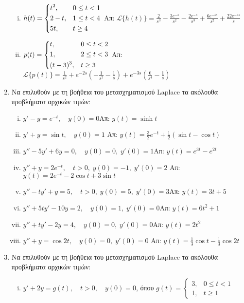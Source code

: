 \begin{enumerate}
\begin{enumerate}[i)]
      \item $h(t)=
        \begin{dcases} 
          t^{2}, & 0\leq t<1 \\ 2-t, & 1\leq t < 4 \\ 5t, & t\geq 4
        \end{dcases}$ 
        \hfill Απ: $\mathcal{L}\{h(t)\}=\frac{2}{s^{3}}-\frac{3e^{-s}}{s^{2}}-
        \frac{2e^{-s}}{s^{3}}+\frac{6e^{-4s}}{s^{2}}+\frac{22e^{-4s}}{s}$

      \item $p(t)=
        \begin{dcases} 
          t, & 0\leq t< 2 \\ 1, & 2\leq t < 3 \\ (t-3)^{3}, & t\geq 3
        \end{dcases}$ 
        \hfill Απ: $\mathcal{L}\{p(t)\}=\frac{1}{s^{2}}+e^{-2s}
        \left(-\frac{1}{s^{2}}-\frac{1}{s}\right)+e^{-3s}
        \left(\frac{6}{s^{4}}-\frac{1}{s}\right)$
    \end{enumerate}

  \item Να επιλυθούν με τη βοήθεια του μετασχηματισμού Laplace τα ακόλουθα 
    προβλήματα αρχικών τιμών:
    \begin{enumerate}[i)]
      \item $y'-y=e^{-t},\quad y(0)=0$\hfill Απ: $y(t)=\sinh t$
      \item $y'+y=\sin t,\quad y(0)=1$
        \hfill Απ: $y(t)=\frac{3}{2}e^{-t}+\frac{1}{2}(\sin t-\cos t)$
      \item $y''-5y'+6y=0,\quad y(0)=0, \; y'(0)=1$\hfill Απ: $y(t)=e^{3t}-e^{2t}$
      \item $y''+y=2e^{-t},\quad t>0, \; y(0)=-1, \; y'(0)=2$
        \hfill Απ: $y(t)=2e^{-t}-2\cos t+3\sin t$
      \item $y''-ty'+y=5, \quad t>0, \; y(0)=5, \; y'(0)=3$\hfill Απ: $y(t)=3t+5$
      \item $y'' +5ty'-10y=2, \quad y(0)=1, \; y'(0)=0$\hfill Απ: $y(t)=6t^2+1$
      \item $y'' +ty'-2y=4, \quad y(0)=0, \; y'(0)=0$\hfill Απ: $y(t)=2t^2$
      \item $y''+y =\cos 2t, \quad y(0)=0, \; y'(0)=0$ 
        \hfill Απ: $y(t)=\frac{1}{3}\cos t-\frac{1}{3}\cos 2t$
    \end{enumerate}

  \item Να επιλυθούν με τη βοήθεια του μετασχηματισμού Laplace τα ακόλουθα 
    προβλήματα αρχικών τιμών:
    \begin{enumerate}[i)]
      \item $y'+2y=g(t),\quad t>0,\quad y(0)=0$, 
        όπου $g(t)=
        \begin{cases}
          3, & 0\leq t<1 \\ 1, & t\geq 1
        \end{cases}$


\end{enumerate}
\end{enumerate}

